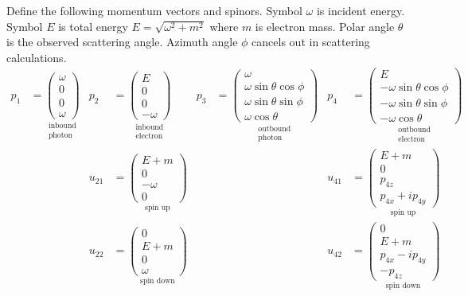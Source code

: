 \documentclass[12pt]{article}
\begin{document}
Define the following momentum vectors and spinors.
Symbol $\omega$ is incident energy.
Symbol $E$ is total energy $E=\sqrt{\omega^2+m^2}$ where $m$ is electron mass.
Polar angle $\theta$ is the observed scattering angle.
Azimuth angle $\phi$ cancels out in scattering calculations.
\begin{align*}
p_1&=
\underset{\substack{\text{inbound}\\\text{photon}}}
{
\begin{pmatrix}\omega\\0\\0\\ \omega\end{pmatrix}
}
&
p_2&=
\underset{\substack{\text{inbound}\\\text{electron}}}
{
\begin{pmatrix}E\\0\\0\\-\omega\end{pmatrix}
}
&
p_3&=
\underset{\substack{\text{outbound}\\\text{photon}}}
{
\begin{pmatrix}
\omega\\
\omega\sin\theta\cos\phi\\
\omega\sin\theta\sin\phi\\
\omega\cos\theta
\end{pmatrix}
}
&
p_4&=
\underset{\substack{\text{outbound}\\\text{electron}}}
{
\begin{pmatrix}
E\\
-\omega\sin\theta\cos\phi\\
-\omega\sin\theta\sin\phi\\
-\omega\cos\theta
\end{pmatrix}
}
\\[1ex]
& & u_{21}&=
\underset{\text{spin up}}
{
\begin{pmatrix}
E+m\\
0\\
-\omega\\
0
\end{pmatrix}
}
&
& & u_{41}&=
\underset{\text{spin up}}
{
\begin{pmatrix}
E+m\\
0\\
p_{4z}\\
p_{4x}+ip_{4y}
\end{pmatrix}
}
\\[1ex]
& & u_{22}&=
\underset{\text{spin down}}
{
\begin{pmatrix}
0\\
E+m\\
0\\
\omega
\end{pmatrix}
}
&
& & u_{42}&=
\underset{\text{spin down}}
{
\begin{pmatrix}
0\\
E+m\\
p_{4x}-ip_{4y}\\
-p_{4z}
\end{pmatrix}
}
\end{align*}
\end{document}
